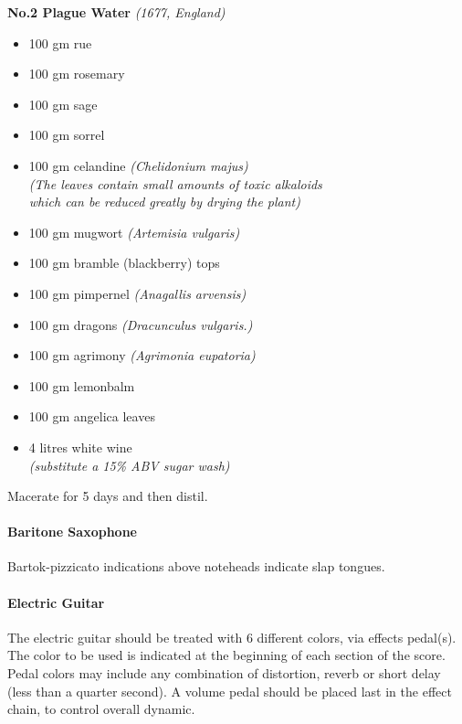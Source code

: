 \documentclass[11pt]{report}
\begin{document}
\begin{titlepage}
\begin{multicols}{2}
{
    \textbf{No.2 Plague Water} \emph{(1677, England)}
    \vspace*{\baselineskip}
    \begin{itemize}
        \renewcommand{\labelitemi}{$\circ$}
        \item 100 gm rue
        \item 100 gm rosemary
        \item 100 gm sage
        \item 100 gm sorrel
        \item 100 gm celandine \emph{(Chelidonium majus)\\
            [0.4\baselineskip]
            (The leaves contain small amounts of toxic alkaloids\\
            which can be reduced greatly by drying the plant)}
        \item 100 gm mugwort \emph{(Artemisia vulgaris)}
        \item 100 gm bramble (blackberry) tops
        \item 100 gm pimpernel \emph{(Anagallis arvensis)}
        \item 100 gm dragons \emph{(Dracunculus vulgaris.)}
        \item 100 gm agrimony \emph{(Agrimonia eupatoria)}
        \item 100 gm lemonbalm
        \item 100 gm angelica leaves
        \item 4 litres white wine\\
            [0.4\baselineskip]
            \emph{(substitute a 15\% ABV sugar wash)}
    \end{itemize}
    \vspace*{\baselineskip}
    Macerate for 5 days and then distil.
}

\columnbreak

{

    \paragraph{Baritone Saxophone}

    Bartok-pizzicato indications above noteheads indicate slap tongues.

    \paragraph{Electric Guitar}

    The electric guitar should be treated with 6 different colors, via effects
    pedal(s). The color to be used is indicated at the beginning of each
    section of the score.  Pedal colors may include any combination of
    distortion, reverb or short delay (less than a quarter second).  A volume
    pedal should be placed last in the effect chain, to control overall
    dynamic.

}
\end{multicols}
\end{titlepage}
\end{document}
